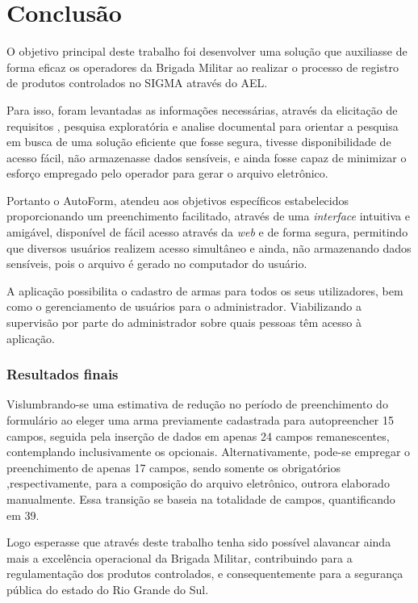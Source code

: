 \chapter{Conclusão}
O objetivo principal deste trabalho foi desenvolver uma solução que auxiliasse de forma eficaz os operadores da Brigada Militar ao realizar o processo de registro de produtos controlados no SIGMA através do AEL.

Para isso, foram levantadas as informações necessárias, através da elicitação de requisitos , pesquisa exploratória e analise documental para orientar a pesquisa em busca de uma solução eficiente que fosse segura, tivesse disponibilidade de acesso fácil, não armazenasse dados sensíveis, e ainda fosse capaz de minimizar o esforço empregado pelo operador para gerar o arquivo eletrônico.

Portanto o AutoForm, atendeu aos objetivos específicos estabelecidos proporcionando um preenchimento facilitado, através de uma \textit{interface} intuitiva e amigável, disponível de fácil acesso através da \textit{web} e de forma segura, permitindo que diversos usuários realizem acesso simultâneo e ainda, não armazenando dados sensíveis, pois o arquivo é gerado no computador do usuário.

A aplicação possibilita o cadastro de armas para todos os seus utilizadores, bem como o gerenciamento de usuários para o administrador. Viabilizando a supervisão por parte do administrador sobre quais pessoas têm acesso à aplicação.

\subsection{Resultados finais}

Vislumbrando-se uma estimativa de redução no período de preenchimento do formulário ao eleger uma arma previamente cadastrada para autopreencher 15 campos, seguida pela inserção de dados em apenas 24 campos remanescentes, contemplando inclusivamente os opcionais. Alternativamente, pode-se empregar o preenchimento de apenas 17 campos, sendo somente os obrigatórios ,respectivamente, para a composição do arquivo eletrônico, outrora elaborado manualmente. Essa transição se baseia na totalidade de campos, quantificando em 39.


Logo esperasse que através deste trabalho tenha sido possível alavancar ainda mais a excelência operacional da Brigada Militar, contribuindo para a regulamentação dos produtos controlados, e consequentemente para a segurança pública do estado do Rio Grande do Sul.

